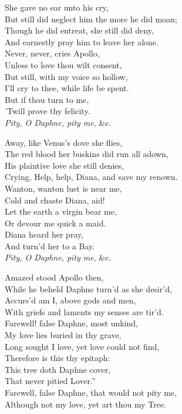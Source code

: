 
\settowidth{\versewidth}{But still did neglect him the more he did moan;}
\begin{dcverse}
\begin{patverse}
She gave no ear unto his cry,\\
But still did neglect him the more he did moan;\\
Though he did entreat, she still did deny,\\
And earnestly pray him to leave her alone.\\
Never, never, cries Apollo,\\
Unless to love thou wilt consent,\\
But still, with my voice so hollow,\\
I’ll cry to thee, while life be spent.\\
But if thou turn to me,\\
’Twill prove thy felicity.\\
\textit{Pity, O Daphne, pity me}, \&c.
\end{patverse}

\begin{patverse}
Away, like Venus’s dove she flies,\\
The red blood her buskins did run all adown,\\
His plaintive love she still denies, \\
Crying, Help, help, Diana, and save my renown.\\
Wanton, wanton lust is near me,\\
Cold and chaste Diana, aid!\\
\columnbreak
Let the earth a virgin bear me,\\
Or devour me quick a maid.\\
Diana heard her pray,\\
And turn'd her to a Bay.\\
\textit{Pity, O Daphne, pity me}, \&c.
\end{patverse}

\begin{patverse}
Amazed stood Apollo then, \\
While he beheld Daphne turn’d as she desir’d,\\
Accurs’d am I, above gods and men,\\
With griefs and laments my senses are tir’d.\\
Farewell! false Daphne, most unkind,\\
My love lies buried in thy grave,\\
Long sought I love, yet love could not find,\\
Therefore is this thy epitaph:\\
This tree doth Daphne cover,\\
That never pitied Lover.” \\
Farewell, false Daphne, that would not pity me,\\
Although not my love, yet art thou my Tree.
\end{patverse}
\end{dcverse}


